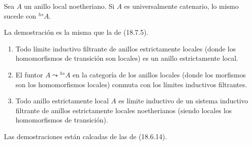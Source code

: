 
\begin{proposition}[18.8.17]
\label{IV.18.8.17}
Sea $A$ un anillo local noetheriano. Si $A$ es universalmente catenario, lo mismo sucede con ${}^{hs}\!A$.
\end{proposition}

La demostración es la misma que la de (18.7.5).

\begin{proposition}[18.8.18]
\label{IV.18.8.18}
\begin{enumerate}
  \item[\textup{(i)}] Todo límite inductivo filtrante de anillos estrictamente locales (donde los homomorfismos de transición son locales) es un anillo estrictamente local.
  \item[\textup{(ii)}] El funtor $A\leadsto{}^{hs}\!A$ en la categoría de los anillos locales (donde los morfismos son los homomorfismos locales) conmuta con los límites inductivos filtrantes.
  \item[\textup{(iii)}] Todo anillo estrictamente local $A$ es límite inductivo de un sistema inductivo filtrante de anillos estrictamente locales noetherianos (siendo locales los homomorfismos de transición).
\end{enumerate}
\end{proposition}

Las demostraciones están calcadas de las de (18.6.14).
